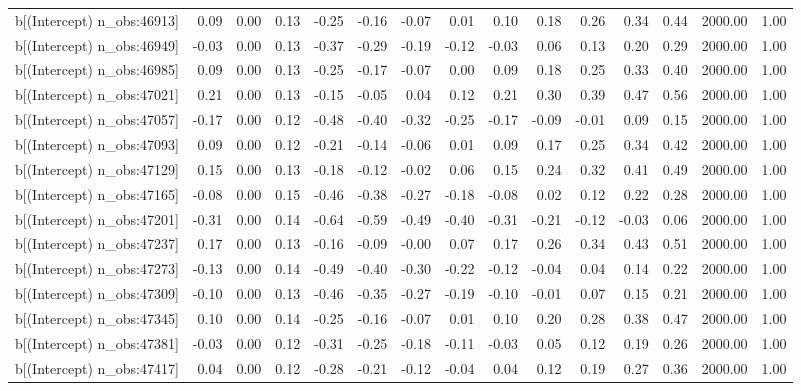 \begin{table}[ht]
\begin{tabular}{rrrrrrrrrrrrrrr}
  b[(Intercept) n\_obs:46913] & 0.09 & 0.00 & 0.13 & -0.25 & -0.16 & -0.07 & 0.01 & 0.10 & 0.18 & 0.26 & 0.34 & 0.44 & 2000.00 & 1.00 \\ 
  b[(Intercept) n\_obs:46949] & -0.03 & 0.00 & 0.13 & -0.37 & -0.29 & -0.19 & -0.12 & -0.03 & 0.06 & 0.13 & 0.20 & 0.29 & 2000.00 & 1.00 \\ 
  b[(Intercept) n\_obs:46985] & 0.09 & 0.00 & 0.13 & -0.25 & -0.17 & -0.07 & 0.00 & 0.09 & 0.18 & 0.25 & 0.33 & 0.40 & 2000.00 & 1.00 \\ 
  b[(Intercept) n\_obs:47021] & 0.21 & 0.00 & 0.13 & -0.15 & -0.05 & 0.04 & 0.12 & 0.21 & 0.30 & 0.39 & 0.47 & 0.56 & 2000.00 & 1.00 \\ 
  b[(Intercept) n\_obs:47057] & -0.17 & 0.00 & 0.12 & -0.48 & -0.40 & -0.32 & -0.25 & -0.17 & -0.09 & -0.01 & 0.09 & 0.15 & 2000.00 & 1.00 \\ 
  b[(Intercept) n\_obs:47093] & 0.09 & 0.00 & 0.12 & -0.21 & -0.14 & -0.06 & 0.01 & 0.09 & 0.17 & 0.25 & 0.34 & 0.42 & 2000.00 & 1.00 \\ 
  b[(Intercept) n\_obs:47129] & 0.15 & 0.00 & 0.13 & -0.18 & -0.12 & -0.02 & 0.06 & 0.15 & 0.24 & 0.32 & 0.41 & 0.49 & 2000.00 & 1.00 \\ 
  b[(Intercept) n\_obs:47165] & -0.08 & 0.00 & 0.15 & -0.46 & -0.38 & -0.27 & -0.18 & -0.08 & 0.02 & 0.12 & 0.22 & 0.28 & 2000.00 & 1.00 \\ 
  b[(Intercept) n\_obs:47201] & -0.31 & 0.00 & 0.14 & -0.64 & -0.59 & -0.49 & -0.40 & -0.31 & -0.21 & -0.12 & -0.03 & 0.06 & 2000.00 & 1.00 \\ 
  b[(Intercept) n\_obs:47237] & 0.17 & 0.00 & 0.13 & -0.16 & -0.09 & -0.00 & 0.07 & 0.17 & 0.26 & 0.34 & 0.43 & 0.51 & 2000.00 & 1.00 \\ 
  b[(Intercept) n\_obs:47273] & -0.13 & 0.00 & 0.14 & -0.49 & -0.40 & -0.30 & -0.22 & -0.12 & -0.04 & 0.04 & 0.14 & 0.22 & 2000.00 & 1.00 \\ 
  b[(Intercept) n\_obs:47309] & -0.10 & 0.00 & 0.13 & -0.46 & -0.35 & -0.27 & -0.19 & -0.10 & -0.01 & 0.07 & 0.15 & 0.21 & 2000.00 & 1.00 \\ 
  b[(Intercept) n\_obs:47345] & 0.10 & 0.00 & 0.14 & -0.25 & -0.16 & -0.07 & 0.01 & 0.10 & 0.20 & 0.28 & 0.38 & 0.47 & 2000.00 & 1.00 \\ 
  b[(Intercept) n\_obs:47381] & -0.03 & 0.00 & 0.12 & -0.31 & -0.25 & -0.18 & -0.11 & -0.03 & 0.05 & 0.12 & 0.19 & 0.26 & 2000.00 & 1.00 \\ 
  b[(Intercept) n\_obs:47417] & 0.04 & 0.00 & 0.12 & -0.28 & -0.21 & -0.12 & -0.04 & 0.04 & 0.12 & 0.19 & 0.27 & 0.36 & 2000.00 & 1.00 \\ 

\end{tabular}
\end{table}
